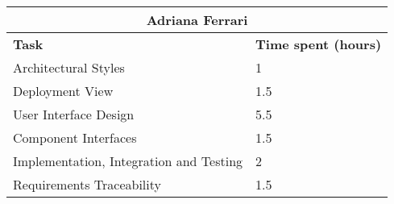 \begin{table}[h]
  \center
  \begin{tabular}{l|l}
    \multicolumn{2}{c}{\textbf{Adriana Ferrari}} \\
    \hline
    \textbf{Task} & \textbf{Time spent (hours)}\\
    \hline
    Architectural Styles & 1 \\
    Deployment View & 1.5 \\
    User Interface Design & 5.5 \\
    Component Interfaces & 1.5 \\ 
    Implementation, Integration and Testing & 2 \\
    Requirements Traceability & 1.5 \\
  \end{tabular}
\end{table}